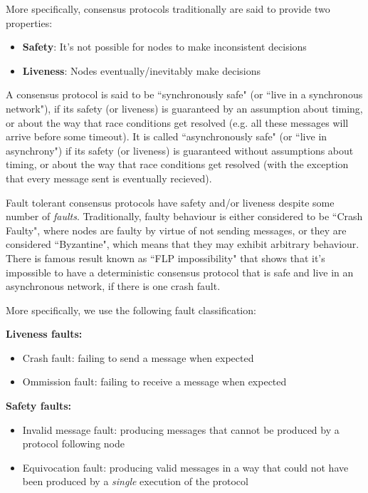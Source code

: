 \documentclass{article}
\theoremstyle{definition}
\begin{document}
More specifically, consensus protocols traditionally are said to provide two properties:
\begin{itemize}
\item \textbf{Safety}: It's not possible for nodes to make inconsistent decisions
\item \textbf{Liveness}: Nodes eventually/inevitably make decisions
\end{itemize}

A consensus protocol is said to be ``synchronously safe" (or ``live in a synchronous network"), if its safety (or liveness) is guaranteed by an assumption about timing, or about the way that race conditions get resolved (e.g. all these messages will arrive before some timeout). It is called ``asynchronously safe" (or ``live in asynchrony") if its safety (or liveness) is guaranteed without assumptions about timing, or about the way that race conditions get resolved (with the exception that every message sent is eventually recieved).

Fault tolerant consensus protocols have safety and/or liveness despite some number of \emph{faults}. Traditionally, faulty behaviour is either considered to be ``Crash Faulty", where nodes are faulty by virtue of not sending messages, or they are considered ``Byzantine", which means that they may exhibit arbitrary behaviour. There is famous result known as ``FLP impossibility" \cite{Fischer_Lynch_Paterson_FLP_Impossibility_1985} that shows that it's impossible to have a deterministic consensus protocol that is safe and live in an asynchronous network, if there is one crash fault.

More specifically, we use the following fault classification:

\textbf{Liveness faults:}
\begin{itemize}
\item Crash fault: failing to send a message when expected
\item Ommission fault: failing to receive a message when expected
\end{itemize}
\textbf{Safety faults:}
\begin{itemize}
\item Invalid message fault: producing messages that cannot be produced by a protocol following node
\item Equivocation fault: producing valid messages in a way that could not have been produced by a \emph{single} execution of the protocol
\end{itemize}
\end{document}
